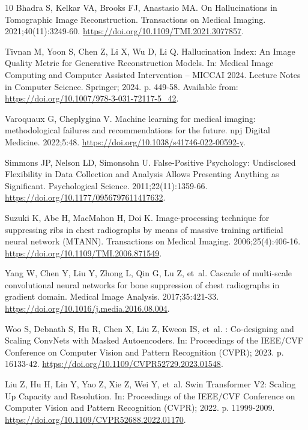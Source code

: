 \begin{thebibliography}{10}
Bhadra S, Kelkar VA, Brooks FJ, Anastasio MA.
\newblock On Hallucinations in Tomographic Image Reconstruction.
 Transactions on Medical Imaging. 2021;40(11):3249-60.
\newblock \url{https://doi.org/10.1109/TMI.2021.3077857}.

Tivnan M, Yoon S, Chen Z, Li X, Wu D, Li Q.
\newblock Hallucination Index: An Image Quality Metric for Generative
  Reconstruction Models.
\newblock In: Medical Image Computing and Computer Assisted Intervention --
  {MICCAI} 2024. Lecture Notes in Computer Science. Springer; 2024. p. 449-58.
\newblock Available from: \url{https://doi.org/10.1007/978-3-031-72117-5_42}.

Varoquaux G, Cheplygina V.
\newblock Machine learning for medical imaging: methodological failures and
  recommendations for the future.
\newblock npj Digital Medicine. 2022;5:48.
\newblock \url{https://doi.org/10.1038/s41746-022-00592-y}.

Simmons JP, Nelson LD, Simonsohn U.
\newblock False-Positive Psychology: Undisclosed Flexibility in Data Collection
  and Analysis Allows Presenting Anything as Significant.
\newblock Psychological Science. 2011;22(11):1359-66.
\newblock \url{https://doi.org/10.1177/0956797611417632}.

Suzuki K, Abe H, MacMahon H, Doi K.
\newblock Image-processing technique for suppressing ribs in chest radiographs
  by means of massive training artificial neural network ({MTANN}).
 Transactions on Medical Imaging. 2006;25(4):406-16.
\newblock \url{https://doi.org/10.1109/TMI.2006.871549}.

Yang W, Chen Y, Liu Y, Zhong L, Qin G, Lu Z, et~al.
\newblock Cascade of multi-scale convolutional neural networks for bone
  suppression of chest radiographs in gradient domain.
\newblock Medical Image Analysis. 2017;35:421-33.
\newblock \url{https://doi.org/10.1016/j.media.2016.08.004}.

Woo S, Debnath S, Hu R, Chen X, Liu Z, Kweon IS, et~al.
: Co-designing and Scaling {ConvNets} with Masked
  Autoencoders.
\newblock In: Proceedings of the {IEEE/CVF} Conference on Computer Vision and
  Pattern Recognition ({CVPR}); 2023. p. 16133-42.
\newblock \url{https://doi.org/10.1109/CVPR52729.2023.01548}.

Liu Z, Hu H, Lin Y, Yao Z, Xie Z, Wei Y, et~al.
\newblock Swin Transformer {V2}: Scaling Up Capacity and Resolution.
\newblock In: Proceedings of the {IEEE/CVF} Conference on Computer Vision and
  Pattern Recognition ({CVPR}); 2022. p. 11999-2009.
\newblock \url{https://doi.org/10.1109/CVPR52688.2022.01170}.


\end{thebibliography}
